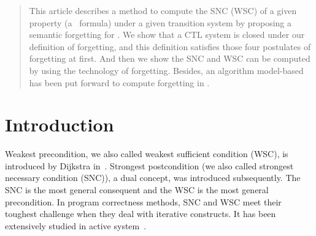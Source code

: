\documentclass{article}
\begin{document}
\newcommand{\CTLsnf}{{\textsc{SNF}_{\textsc{ctl}}^g}}
\newcommand{\ResC}{{\textsc{R}_{\textsc{ctl}}^{\succ, S}}}
\newcommand{\CTLforget}{{\textsc{F}_{\textsc{ctl}}}}
\newcommand{\Refine}{\textsc{Refine}}
\newcommand{\cf}{\textrm{cf.}}
\newcommand{\NEXP}{\textmd{\rm NEXP}}
\newcommand{\EXP}{\textmd{\rm EXP}}
\newcommand{\coNEXP}{\textmd{\rm co-NEXP}}
\newcommand{\NP}{\textmd{\rm NP}}
\newcommand{\coNP}{\textmd{\rm co-NP}}
\newcommand{\Pol}{\textmd{\rm P}}
\newcommand{\BH}[1]{\textmd{\rm BH}_{#1}}
\newcommand{\coBH}[1]{\textmd{\rm co-BH}_{#1}}
\newcommand{\Empty}{\varnothing}
\newcommand{\NLOG}{\textmd{\rm NLOG}}
\newcommand{\DeltaP}[1]{\Delta_{#1}^{p}}
\newcommand{\PIP}[1]{\Pi_{#1}^{p}}
\newcommand{\SigmaP}[1]{\Sigma_{#1}^{p}}



\maketitle

\begin{abstract}
This article describes a method to compute the SNC (WSC) of a given property (a \CTL\ formula) under a given transition system by proposing a semantic forgetting for \CTL.
We show that a CTL system is closed under our definition of forgetting, and this definition satisfies those four postulates of forgetting at first.
And then we show the SNC and WSC can be computed by using the technology of forgetting.
Besides, an algorithm model-based has been put forward to compute forgetting in \CTL.
\end{abstract}

\section{Introduction}
Weakest precondition, we also called weakest sufficient condition (WSC), is introduced by Dijkstra in~\cite{dijkstra1978guarded}.
Strongest postcondition (we also called strongest necessary condition (SNC)), a dual concept, was introduced subsequently.
The SNC is the most general consequent and the WSC is the most general precondition.
In program correctness methods, SNC and WSC meet their toughest challenge when
they deal with iterative constructs.
It has been extensively studied in active system~\cite{mraihi2011computing,bruggink2011conditional}.
\end{document}
